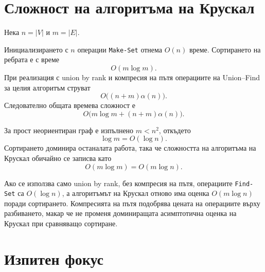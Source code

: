 \section{Сложност на алгоритъма на Крускал}\label{s:7.6}

Нека $n=|V|$ и $m=|E|$.

Инициализирането с $n$ операции \verb|Make-Set| отнема $O(n)$ време. Сортирането на ребрата е с време
\[
O(m\log m).
\]
При реализация с union by rank и компресия на пътя операциите на Union--Find за целия алгоритъм струват
\[
O\bigl((n+m)\alpha(n)\bigr).
\]
Следователно общата времева сложност е
\[
O\bigl(m\log m+(n+m)\alpha(n)\bigr).
\]

За прост неориентиран граф е изпълнено $m<n^2$, откъдето
\[
\log m=O(\log n).
\]
Сортирането доминира останалата работа, така че сложността на алгоритъма на Крускал обичайно се записва като
\[
O(m\log m)=O(m\log n).
\]

\begin{supp}[Бележка]
Ако се използва само union by rank, без компресия на пътя, операциите \verb|Find-Set| са $O(\log n)$, а алгоритъмът на Крускал отново има оценка $O(m\log n)$ поради сортирането. Компресията на пътя подобрява цената на операциите върху разбиването, макар че не променя доминиращата асимптотична оценка на Крускал при сравняващо сортиране.
\end{supp}

\section{Изпитен фокус}\label{s:7.7}

